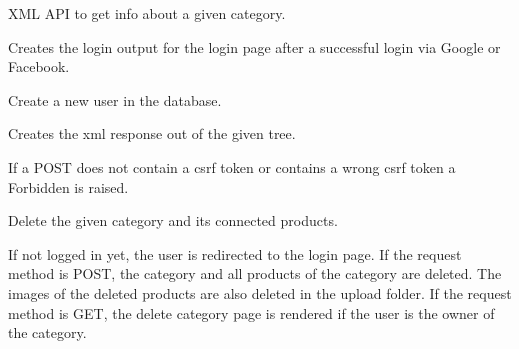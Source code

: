 \documentclass[letterpaper,10pt,english]{sphinxmanual}
\begin{document}

\begin{fulllineitems}
\label{application:application.categoryXML}
XML API to get info about a given category.

\end{fulllineitems}


\begin{fulllineitems}
\label{application:application.createLoginOutput}
Creates the login output for the login page
after a successful login via Google or Facebook.

\end{fulllineitems}


\begin{fulllineitems}
\label{application:application.createUser}
Create a new user in the database.

\end{fulllineitems}


\begin{fulllineitems}
\label{application:application.createXMLResponse}
Creates the xml response out of the given tree.

\end{fulllineitems}


\begin{fulllineitems}
\label{application:application.csrf_protect}
If a POST does not contain a csrf token
or contains a wrong csrf token
a Forbidden is raised.

\end{fulllineitems}


\begin{fulllineitems}
\label{application:application.deleteCategory}
Delete the given category and its connected products.

If not logged in yet, the user is redirected to
the login page.
If the request method is POST, the category and all
products of the category are deleted. The images of
the deleted products are also deleted in the upload
folder.
If the request method is GET, the delete category page is
rendered if the user is the owner of the category.

\end{fulllineitems}
\end{document}
